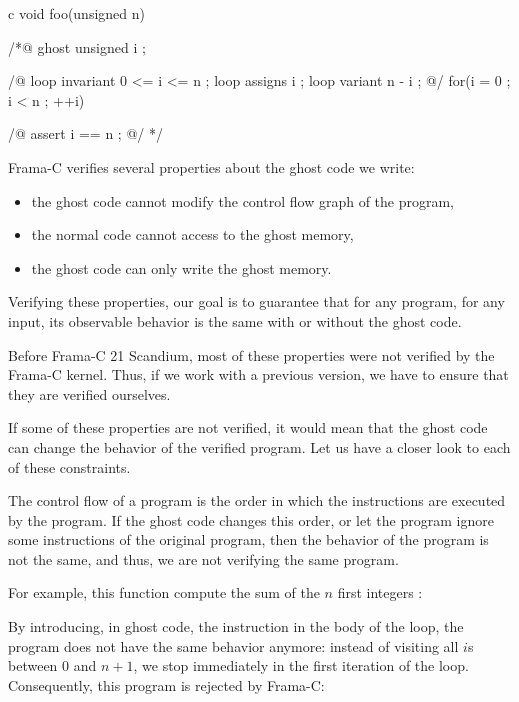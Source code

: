 \begin{CodeBlock}{c}
void foo(unsigned n){
 /*@ ghost
   unsigned i ;

   /@
     loop invariant 0 <= i <= n ;
     loop assigns i ;
     loop variant n - i ;
   @/
   for(i = 0 ; i < n ; ++i){

   }
   /@ assert i == n ; @/
 */
}
\end{CodeBlock}




Frama-C verifies several properties about the ghost code we write:
\begin{itemize}
\item the ghost code cannot modify the control flow graph of the program,
\item the normal code cannot access to the ghost memory,
\item the ghost code can only write the ghost memory.
\end{itemize}

Verifying these properties, our goal is to guarantee that for any
program, for any input, its observable behavior is the same with or
without the ghost code.


\begin{Warning}
  Before Frama-C 21 Scandium, most of these properties were not
  verified by the Frama-C kernel. Thus, if we work with a previous
  version, we have to ensure that they are verified ourselves.
\end{Warning}


If some of these properties are not verified, it would mean that
the ghost code can change the behavior of the verified program.
Let us have a closer look to each of these constraints.




The control flow of a program is the order in which the instructions
are executed by the program. If the ghost code changes this order, or
let the program ignore some instructions of the original program, then
the behavior of the program is not the same, and thus, we are not
verifying the same program.


For example, this function compute the sum of the $n$ first integers :




By introducing, in ghost code, the instruction  in
the body of the loop, the program does not have the same behavior
anymore: instead of visiting all $i$s between $0$ and $n+1$, we stop
immediately in the first iteration of the loop. Consequently, this
program is rejected by Frama-C:


